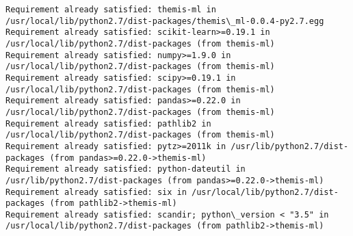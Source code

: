 \documentclass[11pt]{article}
\begin{document}
    \begin{Verbatim}[commandchars=\\\{\}]
Requirement already satisfied: themis-ml in /usr/local/lib/python2.7/dist-packages/themis\_ml-0.0.4-py2.7.egg
Requirement already satisfied: scikit-learn>=0.19.1 in /usr/local/lib/python2.7/dist-packages (from themis-ml)
Requirement already satisfied: numpy>=1.9.0 in /usr/local/lib/python2.7/dist-packages (from themis-ml)
Requirement already satisfied: scipy>=0.19.1 in /usr/local/lib/python2.7/dist-packages (from themis-ml)
Requirement already satisfied: pandas>=0.22.0 in /usr/local/lib/python2.7/dist-packages (from themis-ml)
Requirement already satisfied: pathlib2 in /usr/local/lib/python2.7/dist-packages (from themis-ml)
Requirement already satisfied: pytz>=2011k in /usr/lib/python2.7/dist-packages (from pandas>=0.22.0->themis-ml)
Requirement already satisfied: python-dateutil in /usr/lib/python2.7/dist-packages (from pandas>=0.22.0->themis-ml)
Requirement already satisfied: six in /usr/local/lib/python2.7/dist-packages (from pathlib2->themis-ml)
Requirement already satisfied: scandir; python\_version < "3.5" in /usr/local/lib/python2.7/dist-packages (from pathlib2->themis-ml)

    \end{Verbatim}
\end{document}
